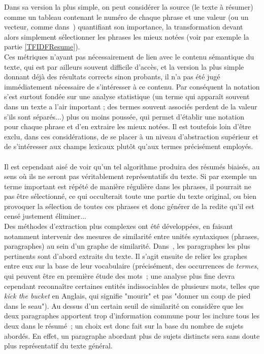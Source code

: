 \documentclass[a4paper, 12pt]{article}
\begin{document}
Dans sa version la plus simple, on peut considérer la source (le texte à résumer) comme un tableau contenant le numéro de chaque phrase et une valeur (ou un vecteur, comme dans~\cite{fattah_ga_2009}) quantifiant son importance, la transformation devant alors simplement sélectionner les phrases les mieux notées (voir par exemple la partie \ref{TFIDFResume}). \\

Ces métriques n'ayant pas nécessairement de lien avec le contenu sémantique du texte, qui est par ailleurs souvent difficile d'accès, et la version la plus simple donnant déjà des résultats corrects sinon probants, il n'a pas été jugé immédiatement nécessaire de s'intéresser à ce contenu. Par conséquent la notation s'est surtout fondée sur une analyse statistique (un terme qui apparaît souvent dans un texte a l'air important ; des termes souvent associés perdent de la valeur s'ils sont séparés...) plus ou moins poussée, qui permet d'établir une notation pour chaque phrase et d'en extraire les mieux notées. Il est toutefois loin d'être exclu, dans ces considérations, de se placer à un niveau d'abstraction supérieur et de s'intéresser aux champs lexicaux plutôt qu'aux termes précisément employés.


\paragraph{}
Il est cependant aisé de voir qu'un tel algorithme produira des résumés biaisés, au sens où ils ne seront pas véritablement représentatifs du texte. Si par exemple un terme important est répété de manière régulière dans les phrases, il pourrait ne pas être sélectionné, ce qui occulterait toute une partie du texte original, ou bien provoquer la sélection de toutes ces phrases et donc générer de la redite qu'il est censé justement éliminer... \\

Des méthodes d'extraction plus complexes ont été développées, en faisant notamment intervenir des mesures de similarité entre unités syntaxiques (phrases, paragraphes) au sein d'un graphe de similarité. Dans~\cite{salton_automatic_1997}, les paragraphes les plus pertinents sont d'abord extraits du texte. Il s'agit ensuite de relier les graphes entre eux sur la base de leur vocabulaire (précisément, des occurrences de \emph{termes}, qui peuvent être en première étude des mots~; une analyse plus fine devra cependant reconnaître certaines entités indissociables de plusieurs mots, telles que \textit{kick the bucket} en Anglais, qui signifie "mourir" et pas "donner un coup de pied dans le seau"). Au dessus d'un certain seuil de similarité on considère que les deux paragraphes apportent trop d'information commune pour les inclure tous les deux dans le résumé~; un choix est donc fait sur la base du nombre de sujets abordés. En effet, un paragraphe abordant plus de sujets distincts sera sans doute plus représentatif du texte général.
\end{document}
